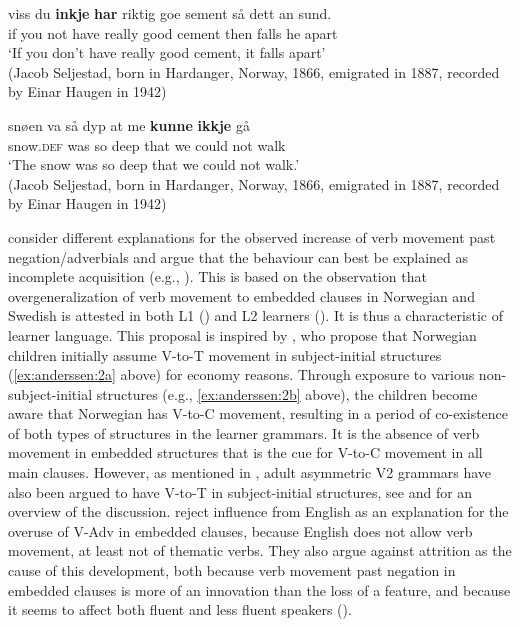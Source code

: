 \documentclass[output=paper]{langscibook}
\begin{document}
\ex%
    \label{ex:anderssen:18}
    \gll viss du   \textbf{inkje} \textbf{har}   riktig  goe   sement så     dett an sund.\\
		 if     you not     have really good cement then falls he apart\\
 \glt ‘If you don’t have really good cement, it falls apart’\\
        (Jacob Seljestad, born in Hardanger, Norway, 1866, emigrated in 1887, recorded by Einar Haugen in 1942) 

\ex%
    \label{ex:anderssen:19}
    \gll snøen       va   så dyp   at    me \textbf{kunne} \textbf{ikkje} gå\\
		 snow.\textsc{def} was so deep that we  could  not     walk\\
	 \glt ‘The snow was so deep that we could not walk.’\\
(Jacob Seljestad, born in Hardanger, Norway, 1866, emigrated in 1887, recorded by Einar Haugen in 1942) 
\z

\citet{LarssonJohannessen2015Embedded,LarssonJohannessen2015Incomplete} consider different explanations for the observed increase of verb movement past negation/adverbials and argue that the behaviour can best be explained as incomplete acquisition (e.g., \citealt{Montrul2002,Montrul2008, Polinsky2018}). This is based on the observation that overgeneralization of verb movement to embedded clauses in Norwegian and Swedish is attested in both L1 (\citealt{WestergaardBentzen2007, Waldmann2008}) and L2 learners (\citealt{PienemannHåkansson1999}). It is thus a characteristic of learner language. This proposal is inspired by \citet{WestergaardBentzen2007}, who propose that Norwegian children initially assume V-to-T movement in subject\hyp initial structures (\ref{ex:anderssen:2a} above) for economy reasons. Through exposure to various non\hyp subject\hyp initial structures (e.g., \ref{ex:anderssen:2b} above), the children become aware that Norwegian has V-to-C movement, resulting in a period of co-existence of both types of structures in the learner grammars. It is the absence of verb movement in embedded structures that is the cue for V-to-C movement in all main clauses. However, as mentioned in , adult asymmetric V2 grammars have also been argued to have V-to-T in subject\hyp initial structures, see \citet{Holmberg2015} and \citet{WestergaardLohndalAlexiadou2019} for an overview of the discussion. \citet{LarssonJohannessen2015Embedded,LarssonJohannessen2015Incomplete} reject influence from English as an explanation for the overuse of V-Adv in embedded clauses, because English does not allow verb movement, at least not of thematic verbs. They also argue against attrition as the cause of this development, both because verb movement past negation in embedded clauses is more of an innovation than the loss of a feature, and because it seems to affect both fluent and less fluent speakers (\citealt{LarssonJohannessen2015Embedded,LarssonJohannessen2015Incomplete}).
\end{document}
